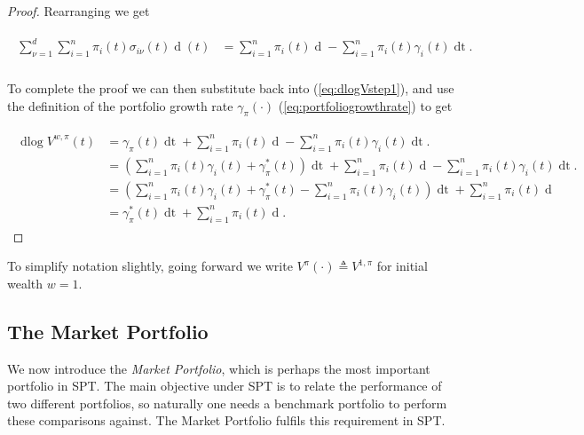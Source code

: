 \documentclass[british]{amsart} \usepackage{lmodern}
\numberwithin{equation}{section} \numberwithin{figure}{section}
\theoremstyle{plain} \newtheorem{thm}{\protect\theoremname}[section]
\theoremstyle{definition} \newtheorem{defn}[thm]{\protect\definitionname}
\theoremstyle{plain} \newtheorem{assumption}[thm]{\protect\assumptionname}
\theoremstyle{plain} \newtheorem{lem}[thm]{\protect\lemmaname}
\theoremstyle{plain} \newtheorem{prop}[thm]{\protect\propositionname}
\theoremstyle{remark} \newtheorem{rem}[thm]{\protect\remarkname}
\theoremstyle{plain} \newtheorem{cor}[thm]{\protect\corollaryname}
\renewcommand{\d}[1]{\mathop{\mathrm{d}{#1}}}
\newcommand{\defeq}{\mathop{\triangleq}} \newcommand{\almostsurely}{\text{a.s.}}
\newcommand{\V}{V^{w,\pi}}
\begin{document}
\begin{proof}
  Rearranging we get 

  \begin{gather*}
    \begin{split}
       \sum_{\nu=1}^{d} \sum_{i=1}^{n} 
            \pi_{i}(t) \sigma_{i\nu}(t) \d{W_{\nu}}(t) &=
       \sum_{i=1}^{n} \pi_{i}(t) \d{\log{X_{i}(t)}} -
       \sum_{i=1}^{n} \pi_{i}(t) \gamma_{i}(t) \d{t}. \\
    \end{split}
  \end{gather*}

  To complete the proof we can then substitute back into (\ref{eq:dlogVstep1}),
  and use the  definition of the portfolio growth rate $\gamma_{\pi}(\cdot)$
  (\ref{eq:portfoliogrowthrate}) to get 

  \begin{gather}
    \begin{split}
      \d\log{\V(t)} 
      &=
        \gamma_{\pi}(t) \d{t} +
        \sum_{i=1}^{n} \pi_{i}(t) \d{\log{X_{i}(t)}} -
        \sum_{i=1}^{n} \pi_{i}(t) \gamma_{i}(t) \d{t}. \\
      &=
        \left( 
            \sum_{i=1}^{n} \pi_{i}(t)\gamma_{i}(t) + \gamma_{\pi}^{*}(t) 
        \right) \d{t} +
        \sum_{i=1}^{n} \pi_{i}(t) \d{\log{X_{i}(t)}} -
        \sum_{i=1}^{n} \pi_{i}(t) \gamma_{i}(t) \d{t}. \\
       &=
        \left( 
            \sum_{i=1}^{n} \pi_{i}(t)\gamma_{i}(t) 
            + \gamma_{\pi}^{*}(t) 
            - \sum_{i=1}^{n} \pi_{i}(t) \gamma_{i}(t)
        \right) \d{t} +
        \sum_{i=1}^{n} \pi_{i}(t) \d{\log{X_{i}(t)}} \\
       &=
        \gamma_{\pi}^{*}(t)\d{t} +
        \sum_{i=1}^{n} \pi_{i}(t) \d{\log{X_{i}(t)}}.
    \end{split}
  \end{gather}

\end{proof}

To simplify notation slightly, going forward we write $V^{\pi}(\cdot) \defeq V^{1,\pi}$ for initial wealth $w=1$.

\newpage
\subsection{The Market Portfolio}

We now introduce the \textit{Market Portfolio}, which is perhaps the most
important portfolio in SPT. The main objective under SPT is to relate the 
performance of two different portfolios, so naturally one needs a 
benchmark portfolio to perform these comparisons against. The Market Portfolio
fulfils this requirement in SPT.
\end{document}
